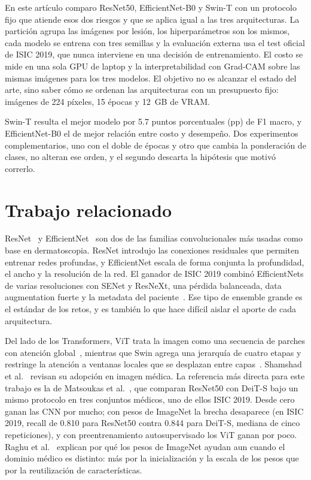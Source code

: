 \documentclass[conference]{IEEEtran}
\begin{document}
En este artículo comparo ResNet50, EfficientNet-B0 y Swin-T con un protocolo fijo que atiende esos dos riesgos y que se aplica igual a las tres arquitecturas. La partición agrupa las imágenes por lesión, los hiperparámetros son los mismos, cada modelo se entrena con tres semillas y la evaluación externa usa el test oficial de ISIC 2019, que nunca interviene en una decisión de entrenamiento. El costo se mide en una sola GPU de laptop y la interpretabilidad con Grad-CAM sobre las mismas imágenes para los tres modelos. El objetivo no es alcanzar el estado del arte, sino saber cómo se ordenan las arquitecturas con un presupuesto fijo: imágenes de 224 píxeles, 15 épocas y 12~GB de VRAM.

Swin-T resulta el mejor modelo por 5.7 puntos porcentuales (pp) de F1 macro, y EfficientNet-B0 el de mejor relación entre costo y desempeño. Dos experimentos complementarios, uno con el doble de épocas y otro que cambia la ponderación de clases, no alteran ese orden, y el segundo descarta la hipótesis que motivó correrlo.

\section{Trabajo relacionado}

ResNet~\cite{he2016resnet} y EfficientNet~\cite{tan2019efficientnet} son dos de las familias convolucionales más usadas como base en dermatoscopia. ResNet introdujo las conexiones residuales que permiten entrenar redes profundas, y EfficientNet escala de forma conjunta la profundidad, el ancho y la resolución de la red. El ganador de ISIC 2019 combinó EfficientNets de varias resoluciones con SENet y ResNeXt, una pérdida balanceada, data augmentation fuerte y la metadata del paciente~\cite{gessert2020isic}. Ese tipo de ensemble grande es el estándar de los retos, y es también lo que hace difícil aislar el aporte de cada arquitectura.

Del lado de los Transformers, ViT trata la imagen como una secuencia de parches con atención global~\cite{dosovitskiy2021vit}, mientras que Swin agrega una jerarquía de cuatro etapas y restringe la atención a ventanas locales que se desplazan entre capas~\cite{liu2021swin}. Shamshad et al.~\cite{shamshad2023transformers} revisan su adopción en imagen médica. La referencia más directa para este trabajo es la de Matsoukas et al.~\cite{matsoukas2021replace,matsoukas2023pretrained}, que comparan ResNet50 con DeiT-S bajo un mismo protocolo en tres conjuntos médicos, uno de ellos ISIC 2019. Desde cero ganan las CNN por mucho; con pesos de ImageNet la brecha desaparece (en ISIC 2019, recall de 0.810 para ResNet50 contra 0.844 para DeiT-S, mediana de cinco repeticiones), y con preentrenamiento autosupervisado los ViT ganan por poco. Raghu et al.~\cite{raghu2019transfusion} explican por qué los pesos de ImageNet ayudan aun cuando el dominio médico es distinto: más por la inicialización y la escala de los pesos que por la reutilización de características.
\end{document}
